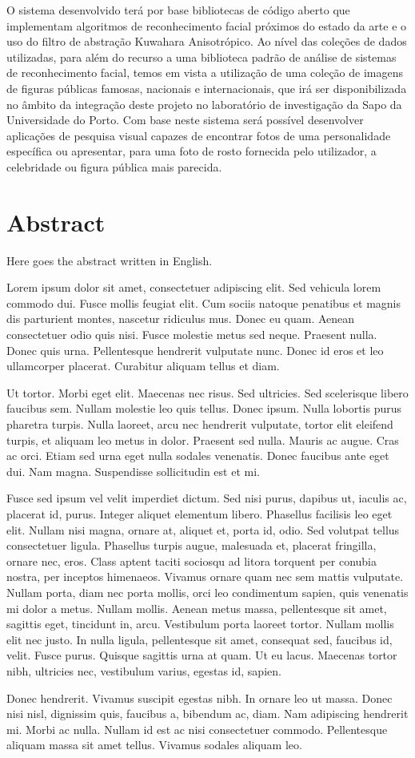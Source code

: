 O sistema desenvolvido terá por base bibliotecas de código aberto que implementam algoritmos de reconhecimento facial próximos do estado da arte e o uso do filtro de abstração Kuwahara Anisotrópico. Ao nível das coleções de dados utilizadas, para além do recurso a uma biblioteca padrão de análise de sistemas de reconhecimento facial, temos em vista a utilização de uma coleção de imagens de figuras públicas famosas, nacionais e internacionais, que irá ser disponibilizada no âmbito da integração deste projeto no laboratório de investigação da Sapo da Universidade do Porto. 
Com base neste sistema será possível desenvolver aplicações de pesquisa visual capazes de encontrar fotos de uma personalidade específica ou apresentar, para uma foto de rosto fornecida pelo utilizador, a celebridade ou figura pública mais parecida.

\chapter*{Abstract}

Here goes the abstract written in English.

Lorem ipsum dolor sit amet, consectetuer adipiscing elit. Sed vehicula
lorem commodo dui. Fusce mollis feugiat elit. Cum sociis natoque
penatibus et magnis dis parturient montes, nascetur ridiculus
mus. Donec eu quam. Aenean consectetuer odio quis nisi. Fusce molestie
metus sed neque. Praesent nulla. Donec quis urna. Pellentesque
hendrerit vulputate nunc. Donec id eros et leo ullamcorper
placerat. Curabitur aliquam tellus et diam. 	

Ut tortor. Morbi eget elit. Maecenas nec risus. Sed ultricies. Sed
scelerisque libero faucibus sem. Nullam molestie leo quis
tellus. Donec ipsum. Nulla lobortis purus pharetra turpis. Nulla
laoreet, arcu nec hendrerit vulputate, tortor elit eleifend turpis, et
aliquam leo metus in dolor. Praesent sed nulla. Mauris ac augue. Cras
ac orci. Etiam sed urna eget nulla sodales venenatis. Donec faucibus
ante eget dui. Nam magna. Suspendisse sollicitudin est et mi. 

Fusce sed ipsum vel velit imperdiet dictum. Sed nisi purus, dapibus
ut, iaculis ac, placerat id, purus. Integer aliquet elementum
libero. Phasellus facilisis leo eget elit. Nullam nisi magna, ornare
at, aliquet et, porta id, odio. Sed volutpat tellus consectetuer
ligula. Phasellus turpis augue, malesuada et, placerat fringilla,
ornare nec, eros. Class aptent taciti sociosqu ad litora torquent per
conubia nostra, per inceptos himenaeos. Vivamus ornare quam nec sem
mattis vulputate. Nullam porta, diam nec porta mollis, orci leo
condimentum sapien, quis venenatis mi dolor a metus. Nullam
mollis. Aenean metus massa, pellentesque sit amet, sagittis eget,
tincidunt in, arcu. Vestibulum porta laoreet tortor. Nullam mollis
elit nec justo. In nulla ligula, pellentesque sit amet, consequat sed,
faucibus id, velit. Fusce purus. Quisque sagittis urna at quam. Ut eu
lacus. Maecenas tortor nibh, ultricies nec, vestibulum varius, egestas
id, sapien. 

Donec hendrerit. Vivamus suscipit egestas nibh. In ornare leo ut
massa. Donec nisi nisl, dignissim quis, faucibus a, bibendum ac,
diam. Nam adipiscing hendrerit mi. Morbi ac nulla. Nullam id est ac
nisi consectetuer commodo. Pellentesque aliquam massa sit amet
tellus. Vivamus sodales aliquam leo. 

